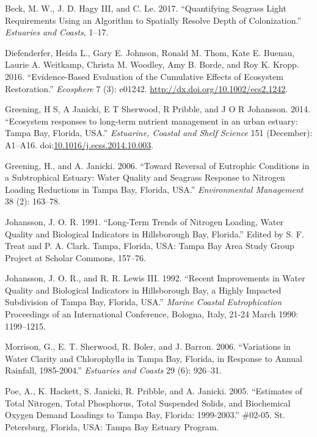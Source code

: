\documentclass[]{article}
\begin{document}
\hypertarget{ref-Beck17c}{}
Beck, M. W., J. D. Hagy III, and C. Le. 2017. ``Quantifying Seagrass
Light Requirements Using an Algorithm to Spatially Resolve Depth of
Colonization.'' \emph{Estuaries and Coasts}, 1--17.

\hypertarget{ref-Diefenderfer16}{}
Diefenderfer, Heida L., Gary E. Johnson, Ronald M. Thom, Kate E. Buenau,
Laurie A. Weitkamp, Christa M. Woodley, Amy B. Borde, and Roy K. Kropp.
2016. ``Evidence-Based Evaluation of the Cumulative Effects of Ecosystem
Restoration.'' \emph{Ecosphere} 7 (3): e01242.
\url{http://dx.doi.org/10.1002/ecs2.1242}.

\hypertarget{ref-Greening2014}{}
Greening, H S, A Janicki, E T Sherwood, R Pribble, and J O R Johansson.
2014. ``Ecosystem responses to long-term nutrient management in an urban
estuary: Tampa Bay, Florida, USA.'' \emph{Estuarine, Coastal and Shelf
Science} 151 (December): A1--A16.
doi:\href{https://doi.org/10.1016/j.ecss.2014.10.003}{10.1016/j.ecss.2014.10.003}.

\hypertarget{ref-Greening06}{}
Greening, H., and A. Janicki. 2006. ``Toward Reversal of Eutrophic
Conditions in a Subtrophical Estuary: Water Quality and Seagrass
Response to Nitrogen Loading Reductions in Tampa Bay, Florida, USA.''
\emph{Environmental Management} 38 (2): 163--78.

\hypertarget{ref-Johansson91}{}
Johansson, J. O. R. 1991. ``Long-Term Trends of Nitrogen Loading, Water
Quality and Biological Indicators in Hillsborough Bay, Florida.'' Edited
by S. F. Treat and P. A. Clark. Tampa, Florida, USA: Tampa Bay Area
Study Group Project at Scholar Commons, 157--76.

\hypertarget{ref-Johansson92}{}
Johansson, J. O. R., and R. R. Lewis III. 1992. ``Recent Improvements in
Water Quality and Biological Indicators in Hillsborough Bay, a Highly
Impacted Subdivision of Tampa Bay, Florida, USA.'' \emph{Marine Coastal
Eutrophication} Proceedings of an International Conference, Bologna,
Italy, 21-24 March 1990: 1199--1215.

\hypertarget{ref-Morrison06}{}
Morrison, G., E. T. Sherwood, R. Boler, and J. Barron. 2006.
``Variations in Water Clarity and Chlorophyll\emph{a} in Tampa Bay,
Florida, in Response to Annual Rainfall, 1985-2004.'' \emph{Estuaries
and Coasts} 29 (6): 926--31.

\hypertarget{ref-Poe05}{}
Poe, A., K. Hackett, S. Janicki, R. Pribble, and A. Janicki. 2005.
``Estimates of Total Nitrogen, Total Phosphorus, Total Suspended Solids,
and Biochemical Oxygen Demand Loadings to Tampa Bay, Florida:
1999-2003.'' \#02-05. St. Petersburg, Florida, USA: Tampa Bay Estuary
Program.
\end{document}
